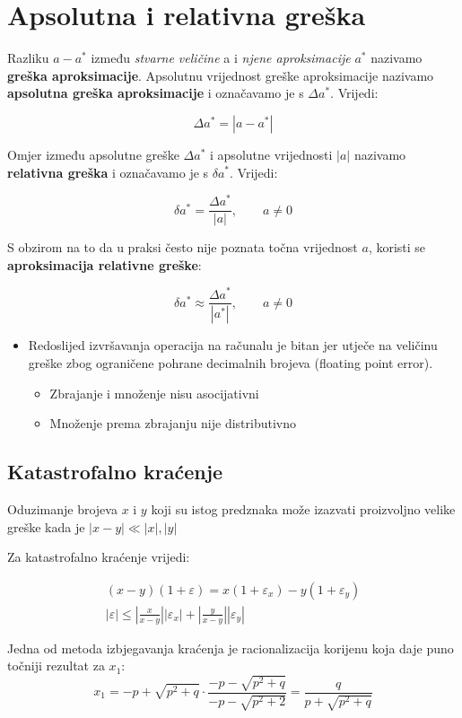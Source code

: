 \section{Apsolutna i relativna greška}

Razliku $a-a^*$ između \textit{stvarne veličine} a i \textit{njene aproksimacije} $a^*$ nazivamo \textbf{greška aproksimacije}. Apsolutnu vrijednost greške aproksimacije nazivamo \textbf{apsolutna greška aproksimacije} i označavamo je s $\Delta a^*$. Vrijedi:

$$
\Delta a^* = |a-a^*|
$$

Omjer između apsolutne greške $\Delta a^*$ i apsolutne vrijednosti $|a|$ nazivamo \textbf{relativna greška} i označavamo je s $\delta a^*$. Vrijedi:

$$
\delta a^* = \frac{\Delta a^*}{|a|},\qquad a\neq0
$$

S obzirom na to da u praksi često nije poznata točna vrijednost $a$, koristi se \textbf{aproksimacija relativne greške}:

$$
\delta a^* \approx \frac{\Delta a^*}{|a^*|},\qquad a\neq0
$$

\begin{itemize}
    \item Redoslijed izvršavanja operacija na računalu je bitan jer utječe na veličinu greške zbog ograničene pohrane decimalnih brojeva (floating point error).
    \begin{itemize}
        \item Zbrajanje i množenje nisu asocijativni
        \item Množenje prema zbrajanju nije distributivno
    \end{itemize}
\end{itemize}

\subsection{Katastrofalno kraćenje}

Oduzimanje brojeva $x$ i $y$ koji su istog predznaka može izazvati proizvoljno velike greške kada je $|x-y| \ll |x|,|y|$

Za katastrofalno kraćenje vrijedi:

\begin{gather*}
(x-y)(1+\varepsilon) = x(1+\varepsilon_x) - y(1+\varepsilon_y)\\
|\varepsilon| \leq \left|\frac{x}{x-y}\right| |\varepsilon_x| + \left|\frac{y}{x-y}\right| |\varepsilon_y|
\end{gather*}

Jedna od metoda izbjegavanja kraćenja je racionalizacija korijenu koja daje puno točniji rezultat za $x_1$:
$$
    x_1=-p+\sqrt{p^2+q}\cdot\frac{-p-\sqrt{p^2+q}}{-p-\sqrt{p^2+2}}=\frac{q}{p+\sqrt{p^2+q}}
$$
